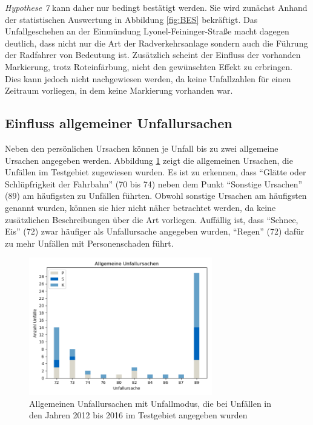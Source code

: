 \textit{Hypothese 7} kann daher nur bedingt bestätigt werden. Sie wird zunächst Anhand der statistischen Auswertung in Abbildung \ref{fig:BES} bekräftigt. Das Unfallgeschehen an der Einmündung Lyonel-Feininger-Straße macht dagegen deutlich, dass nicht nur die Art der Radverkehrsanlage sondern auch die Führung der Radfahrer von Bedeutung ist. Zusätzlich scheint der Einfluss der vorhanden Markierung, trotz Roteinfärbung, nicht den gewünschten Effekt zu erbringen. Dies kann jedoch nicht nachgewiesen werden, da keine Unfallzahlen für einen Zeitraum vorliegen, in dem keine Markierung vorhanden war. 


\subsection{Einfluss allgemeiner Unfallursachen}
Neben den persönlichen Ursachen können je Unfall bis zu zwei allgemeine Ursachen angegeben werden. Abbildung \ref{fig:allg_Ursachen} zeigt die allgemeinen Ursachen, die Unfällen im Testgebiet zugewiesen wurden. Es ist zu erkennen, dass \enquote{Glätte oder Schlüpfrigkeit der Fahrbahn} (70 bis 74) neben dem Punkt \enquote{Sonstige Ursachen} (89) am häufigsten zu Unfällen führten. Obwohl sonstige Ursachen am häufigsten genannt wurden, können sie hier nicht näher betrachtet werden, da keine zusätzlichen Beschreibungen über die Art vorliegen. Auffällig ist, dass \enquote{Schnee, Eis} (72) zwar häufiger als Unfallursache angegeben wurden, \enquote{Regen} (72) dafür zu mehr Unfällen mit Personenschaden führt. 

\begin{savenotes}
	\begin{figure}[H]
		\centering
		\includegraphics[width=8cm,height=6cm]{figures/allg_Ursachen}
		\caption[Allgemeinen Unfallursachen mit Unfallmodus, die bei Unfällen in den Jahren 2012 bis 2016 im Testgebiet angegeben wurden]{Allgemeinen Unfallursachen mit Unfallmodus, die bei Unfällen in den Jahren 2012 bis 2016 im Testgebiet angegeben wurden}\label{fig:allg_Ursachen}
	\end{figure}
\end{savenotes}

